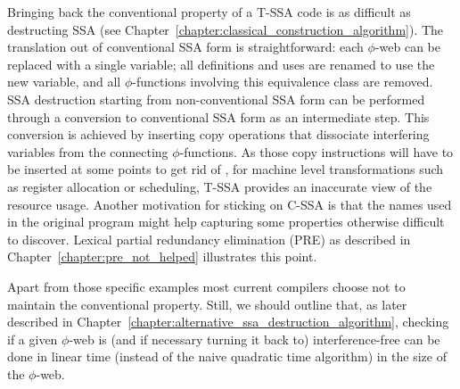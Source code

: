 Bringing back the conventional property of a T-SSA code is as difficult as destructing SSA (see Chapter~\ref{chapter:classical_construction_algorithm}). 
The translation out of conventional SSA form
is straightforward: each $\phi$-web can be replaced with a single
variable; all definitions and uses are renamed to use the new variable,
and all $\phi$-functions involving this equivalence class are removed. 
SSA destruction
starting from non-conventional SSA form can be performed through a conversion to 
conventional SSA form as an intermediate step. This conversion is
achieved by inserting copy operations that dissociate interfering variables from the connecting $\phi$-functions. 
As those copy instructions will have to be inserted at some points to get rid of \phiops, for machine level transformations such as register allocation or scheduling, T-SSA provides an inaccurate view of the resource usage. Another motivation for sticking on C-SSA is that the names used in the original program might help capturing some properties otherwise difficult to discover. Lexical partial redundancy elimination (PRE) as described in Chapter~\ref{chapter:pre_not_helped} illustrates this point.

Apart from those specific examples most current compilers choose not to maintain the conventional property.
Still, we should outline that, as later described in Chapter~\ref{chapter:alternative_ssa_destruction_algorithm}, checking if a given $\phi$-web is (and if necessary turning it back to) interference-free can be done in linear time (instead of the naive quadratic time algorithm) in the size of the $\phi$-web.

